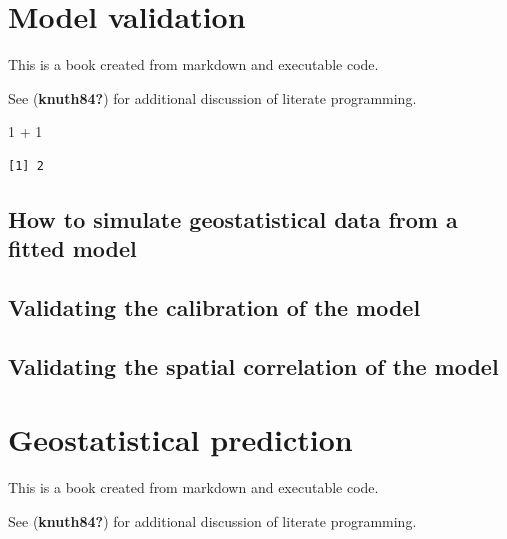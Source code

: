 \documentclass[
  letterpaper,
]{krantz}
\newenvironment{Shaded}{\begin{snugshade}}{\end{snugshade}}
\newcommand{\DecValTok}[1]{\textcolor[rgb]{0.68,0.00,0.00}{#1}}
\newcommand{\SpecialCharTok}[1]{\textcolor[rgb]{0.37,0.37,0.37}{#1}}
\begin{document}
\hypertarget{sec-validation}{%
\chapter{Model validation}\label{sec-validation}}

This is a book created from markdown and executable code.

See (\textbf{knuth84?}) for additional discussion of literate
programming.

\begin{Shaded}
\begin{Highlighting}[]
\DecValTok{1} \SpecialCharTok{+} \DecValTok{1}
\end{Highlighting}
\end{Shaded}

\begin{verbatim}
[1] 2
\end{verbatim}

\hypertarget{how-to-simulate-geostatistical-data-from-a-fitted-model}{%
\section{How to simulate geostatistical data from a fitted
model}\label{how-to-simulate-geostatistical-data-from-a-fitted-model}}

\hypertarget{validating-the-calibration-of-the-model}{%
\section{Validating the calibration of the
model}\label{validating-the-calibration-of-the-model}}

\hypertarget{validating-the-spatial-correlation-of-the-model}{%
\section{Validating the spatial correlation of the
model}\label{validating-the-spatial-correlation-of-the-model}}


\hypertarget{sec-geo-prediction}{%
\chapter{Geostatistical prediction}\label{sec-geo-prediction}}

This is a book created from markdown and executable code.

See (\textbf{knuth84?}) for additional discussion of literate
programming.
\end{document}
